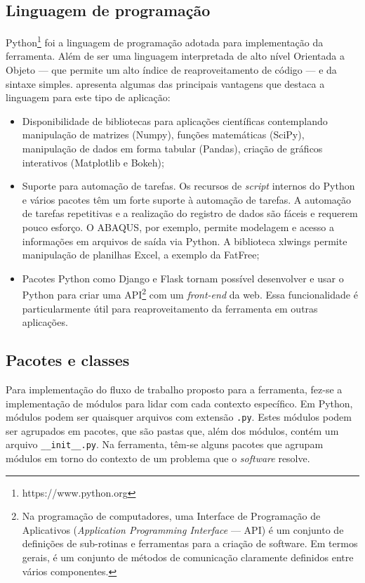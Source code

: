 \subsection{Linguagem de programação}\label{sec:python}

Python\footnote{https://www.python.org} foi a linguagem de programação adotada para implementação da ferramenta. Além de ser uma linguagem interpretada de alto nível Orientada a Objeto --- que permite um alto índice de reaproveitamento de código --- e da sintaxe simples.  apresenta algumas das principais vantagens que destaca a linguagem para este tipo de aplicação:

\begin{itemize}
    \item Disponibilidade de bibliotecas para aplicações científicas contemplando manipulação de matrizes (Numpy), funções matemáticas (SciPy), manipulação de dados em forma tabular (Pandas), criação de gráficos interativos (Matplotlib e Bokeh);

    \item Suporte para automação de tarefas. Os recursos de \textit{script} internos do Python e vários pacotes têm um forte suporte à automação de tarefas. A automação de tarefas repetitivas e a realização do registro de dados são fáceis e requerem pouco esforço. O ABAQUS, por exemplo, permite modelagem e acesso a informações em arquivos de saída via Python. A biblioteca xlwings permite manipulação de planilhas Excel, a exemplo da FatFree;

    \item Pacotes Python como Django e Flask tornam possível desenvolver e usar o Python para criar uma API\footnote{Na programação de computadores, uma Interface de Programação de Aplicativos (\textit{Application Programming Interface} --- API) é um conjunto de definições de sub-rotinas e ferramentas para a criação de software. Em termos gerais, é um conjunto de métodos de comunicação claramente definidos entre vários componentes.} com um \textit{front-end} da web. Essa funcionalidade é particularmente útil para reaproveitamento da ferramenta  em outras aplicações.
\end{itemize}


\subsection{Pacotes e classes}


Para implementação do fluxo de trabalho proposto para a ferramenta, fez-se a implementação de módulos para lidar com cada contexto específico.
Em Python, módulos podem ser quaisquer arquivos com extensão \texttt{.py}.
Estes módulos podem ser agrupados em pacotes, que são pastas que, além dos módulos, contém um arquivo \texttt{\_\_init\_\_.py}.  %
Na ferramenta, têm-se alguns pacotes que agrupam módulos em torno do contexto de um problema que o \textit{software} resolve.


